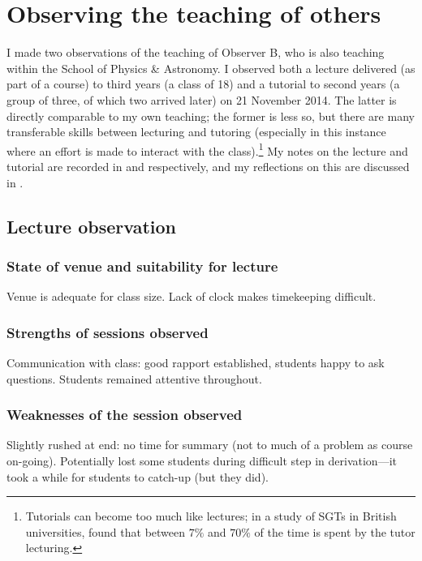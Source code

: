 \section{Observing the teaching of others}\label{sec:other}

I made two observations of the teaching of Observer B, who is also teaching within the School of Physics \& Astronomy. I observed both a lecture delivered (as part of a course) to third years (a class of 18) and a tutorial to second years (a group of three, of which two arrived later) on 21 November 2014. The latter is directly comparable to my own teaching; the former is less so, but there are many transferable skills between lecturing and tutoring (especially in this instance where an effort is made to interact with the class).\footnote{Tutorials can become too much like lectures; in a study of SGTs in British universities, \citet[quoted in \citealt{Brown1988}, chapter 4]{Luker1987} found that between $7\%$ and $70\%$ of the time is spent by the tutor lecturing.} My notes on the lecture and tutorial are recorded in  and  respectively, and my reflections on this are discussed in .

\subsection{Lecture observation}\label{sec:other-lecture}

\subsubsection{State of venue and suitability for lecture}

Venue is adequate for class size. Lack of clock makes timekeeping difficult.

\subsubsection{Strengths of sessions observed}

Communication with class: good rapport established, students happy to ask questions. Students remained attentive throughout.

\subsubsection{Weaknesses of the session observed}

Slightly rushed at end: no time for summary (not to much of a problem as course on-going). Potentially lost some students during difficult step in derivation---it took a while for students to catch-up (but they did).

